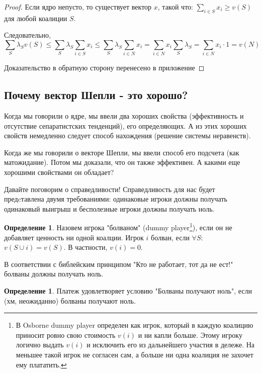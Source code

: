 \documentclass[pdftex,12pt,a4paper]{article}
\numberwithin{equation}{page} %
\theoremstyle{definition} %
\newtheorem{definition}[equation]{Определение}
\theoremstyle{definition}
\theoremstyle{definition}
\begin{document}
\begin{proof}
Если ядро непусто, то существует вектор $x$, такой что: $\sum_{i\in S} x_{i}\geq v(S)$ для любой коалиции $S$.

Следовательно,
\begin{equation}
\sum_{S} \lambda_{S}v(S) \leq \sum_{S} \lambda_{S} \sum_{i\in S} x_{i} \leq \sum_{S} \lambda_{S} \sum_{i\in N} x_{i} = \sum_{i\in N} x_{i} \sum_{S} \lambda_{S} = \sum_{i\in N} x_{i} \cdot 1 = v(N)
\end{equation}

Доказательство в обратную сторону перенесено в приложение
\end{proof}


\subsection{Почему вектор Шепли - это хорошо?}

Когда мы говорили о ядре, мы ввели два хороших свойства (эффективность и отсутствие сепаратистских тенденций), его определяющих. А из этих хороших свойств немедленно следует способ нахождения (решение системы неравенств).

Когда же мы говорили о векторе Шепли, мы ввели способ его подсчета (как матожидание). Потом мы доказали, что он также эффективен. А какими еще хорошими свойствами он обладает?

Давайте поговорим о справедливости! Справедливость для нас будет предcтавлена двумя требованиями: одинаковые игроки должны получать одинаковый выигрыш и бесполезные игроки должны получать ноль.

\begin{definition}
Назовем игрока "болваном" (dummy player\footnote{В Osborne \cite{osborne:cgt} dummy player определен как игрок, который в каждую коалицию приносит ровно свою стоимость $v(i)$ и ни капли больше. Этому игроку логично выдать $v(i)$ и исключить его из дальнейшего участия в дележе. На меньшее такой игрок не согласен сам, а больше ни одна коалиция не захочет ему плататить.}), если он не добавляет ценность ни одной коалции. Игрок $i$ болван, если $\forall S$: $v(S\cup i)=v(S)$. В частности, $v(i)=0$.
\end{definition}

В соответствии с библейским принципом "Кто не работает, тот да не ест!" болваны должны получать ноль.

\begin{definition} Платеж удовлетворяет условию "Болваны получают ноль", если (хм, неожиданно) болваны получают ноль.
\end{definition}
\end{document}
